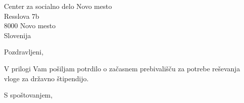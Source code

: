 \documentclass[a4paper]{scrlttr2}
\begin{document}
 
\begin{letter}{Center za socialno delo Novo mesto \\ Resslova 7b \\ 8000 Novo mesto \\ Slovenija}
 

\opening{Pozdravljeni,}
 
V prilogi Vam pošiljam potrdilo o začasnem prebivališču za potrebe reševanja vloge za državno štipendijo.

\closing{S spoštovanjem,}

 
\end{letter}
 
\end{document}

